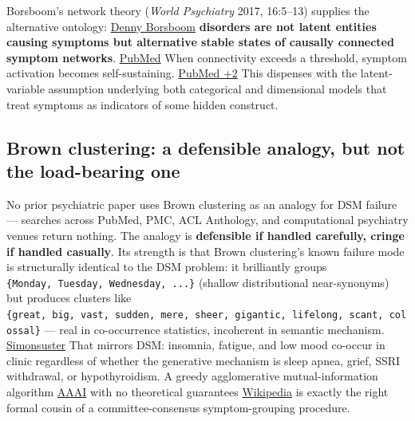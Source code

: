 Borsboom's network theory (\emph{World Psychiatry} 2017, 16:5--13) supplies the alternative ontology: \href{https://dennyborsboom.com/publications/}{Denny Borsboom} \textbf{disorders are not latent entities causing symptoms but alternative stable states of causally connected symptom networks}. \href{https://pubmed.ncbi.nlm.nih.gov/28127906/}{PubMed} When connectivity exceeds a threshold, symptom activation becomes self-sustaining. \href{https://pubmed.ncbi.nlm.nih.gov/23537483/}{PubMed +2} This dispenses with the latent-variable assumption underlying both categorical and dimensional models that treat symptoms as indicators of some hidden construct.

\subsection{Brown clustering: a defensible analogy, but not the load-bearing one}\label{11_dsm_iii-brown-clustering-a-defensible-analogy-but-not-the-load-bearing-one}

No prior psychiatric paper uses Brown clustering as an analogy for DSM failure --- searches across PubMed, PMC, ACL Anthology, and computational psychiatry venues return nothing. The analogy is \textbf{defensible if handled carefully, cringe if handled casually}. Its strength is that Brown clustering's known failure mode is structurally identical to the DSM problem: it brilliantly groups \texttt{\{Monday,\ Tuesday,\ Wednesday,\ ...\}} (shallow distributional near-synonyms) but produces clusters like \texttt{\{great,\ big,\ vast,\ sudden,\ mere,\ sheer,\ gigantic,\ lifelong,\ scant,\ colossal\}} --- real in co-occurrence statistics, incoherent in semantic mechanism. \href{https://simonsuster.github.io/talks/Brown_RUG.pdf}{Simonsuster} That mirrors DSM: insomnia, fatigue, and low mood co-occur in clinic regardless of whether the generative mechanism is sleep apnea, grief, SSRI withdrawal, or hypothyroidism. A greedy agglomerative mutual-information algorithm \href{https://ojs.aaai.org/index.php/AAAI/article/download/10190/10049}{AAAI} with no theoretical guarantees \href{https://en.wikipedia.org/wiki/Brown_clustering}{Wikipedia} is exactly the right formal cousin of a committee-consensus symptom-grouping procedure.

